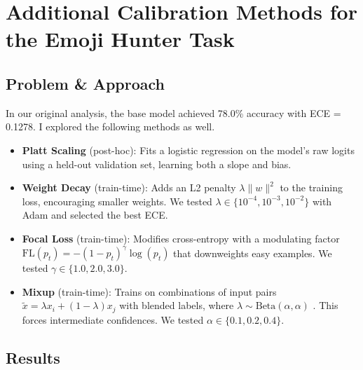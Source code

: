 \section*{Additional Calibration Methods for the Emoji Hunter Task}

\subsection*{Problem \& Approach}
In our original analysis, the base model achieved 78.0\% accuracy with ECE = 0.1278. I explored the following methods as well.

\begin{itemize}
    \item \textbf{Platt Scaling} (post-hoc): Fits a logistic regression on the model's raw logits using a held-out validation set, learning both a slope and bias.
    \item \textbf{Weight Decay} (train-time): Adds an L2 penalty $\lambda \|w\|^2$ to the training loss, encouraging smaller weights. We tested $\lambda \in \{10^{-4}, 10^{-3}, 10^{-2}\}$ with Adam and selected the best ECE.
    \item \textbf{Focal Loss} (train-time): Modifies cross-entropy with a modulating factor $\text{FL}(p_t) = -(1 - p_t)^\gamma \log(p_t)$ that downweights easy examples. We tested $\gamma \in \{1.0, 2.0, 3.0\}$.
    \item \textbf{Mixup} (train-time): Trains on combinations of input pairs $\tilde{x} = \lambda x_i + (1-\lambda)x_j$ with blended labels, where $\lambda \sim \text{Beta}(\alpha, \alpha)$ . This forces intermediate confidences. We tested $\alpha \in \{0.1, 0.2, 0.4\}$.
\end{itemize}

\subsection*{Results}

